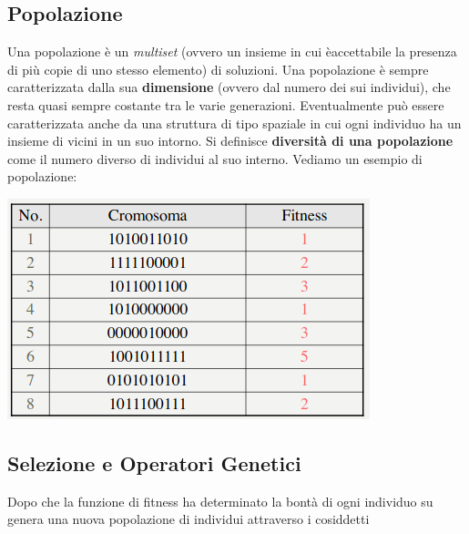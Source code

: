 \message{ !name(ro.tex)}\documentclass[a4paper,12pt, oneside]{book}
\begin{document}
\subsection{Popolazione}
Una popolazione è un \textit{multiset} (ovvero un insieme in cui
èaccettabile la presenza di più copie di uno stesso elemento) di
soluzioni. Una popolazione è sempre caratterizzata dalla sua
\textbf{dimensione} (ovvero dal numero dei sui individui), che resta quasi
sempre costante tra le varie generazioni. Eventualmente può
essere caratterizzata anche da una struttura di tipo spaziale in cui
ogni individuo ha un insieme di vicini in un suo intorno. Si definisce
\textbf{diversità di una popolazione} come il numero diverso di
individui al suo interno.
\newpage
Vediamo un esempio di popolazione:
\begin{center}
  \includegraphics[scale = 0.7]{img/bio3.png}
\end{center}
\subsection{Selezione e Operatori Genetici}
Dopo che la funzione di fitness ha determinato la bontà di ogni
individuo su genera una nuova popolazione di individui attraverso i
cosiddetti 
\end{document}
